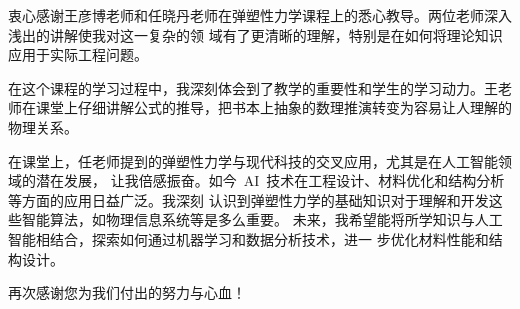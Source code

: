 衷心感谢王彦博老师和任晓丹老师在弹塑性力学课程上的悉心教导。两位老师深入浅出的讲解使我对这一复杂的领
域有了更清晰的理解，特别是在如何将理论知识应用于实际工程问题。

在这个课程的学习过程中，我深刻体会到了教学的重要性和学生的学习动力。王老师在课堂上仔细讲解公式的推导，把书本上抽象的数理推演转变为容易让人理解的物理关系。

在课堂上，任老师提到的弹塑性力学与现代科技的交叉应用，尤其是在人工智能领域的潜在发展，
让我倍感振奋。如今~AI~技术在工程设计、材料优化和结构分析等方面的应用日益广泛。我深刻
认识到弹塑性力学的基础知识对于理解和开发这些智能算法，如物理信息系统等是多么重要。
未来，我希望能将所学知识与人工智能相结合，探索如何通过机器学习和数据分析技术，进一
步优化材料性能和结构设计。


再次感谢您为我们付出的努力与心血！